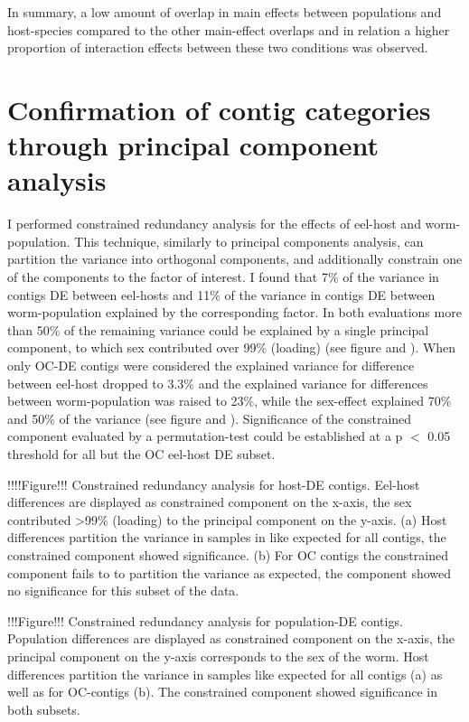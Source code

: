 \documentclass[10pt]{article}
\begin{document}
In summary, a low amount of overlap in main effects between
populations and host-species compared to the other main-effect
overlaps and in relation a higher proportion of interaction effects
between these two conditions was observed.

\section{Confirmation of contig categories through principal component
  analysis}

I performed constrained redundancy analysis for the effects of
eel-host and worm-population. This technique, similarly to principal
components analysis, can partition the variance into orthogonal
components, and additionally constrain one of the components to the
factor of interest. I found that 7\% of the variance in contigs DE
between eel-hosts and 11\% of the variance in contigs DE between
worm-population explained by the corresponding factor. In both
evaluations more than 50\% of the remaining variance could be
explained by a single principal component, to which sex contributed
over 99\% (loading) (see figure and ). When only OC-DE contigs were
considered the explained variance for difference between eel-host
dropped to 3.3\% and the explained variance for differences between
worm-population was raised to 23\%, while the sex-effect explained
70\% and 50\% of the variance (see figure and ). Significance of the
constrained component evaluated by a permutation-test could be
established at a p $<$ 0.05 threshold for all but the OC eel-host DE
subset.

!!!!Figure!!! Constrained redundancy analysis for host-DE
contigs. Eel-host differences are displayed as constrained component
on the x-axis, the sex contributed >99\% (loading) to the principal
component on the y-axis. (a) Host differences partition the variance
in samples in like expected for all contigs, the constrained component
showed significance. (b) For OC contigs the constrained component
fails to to partition the variance as expected, the component showed
no significance for this subset of the data.

!!!Figure!!! Constrained redundancy analysis for population-DE
contigs. Population differences are displayed as constrained component
on the x-axis, the principal component on the y-axis corresponds to
the sex of the worm. Host differences partition the variance in
samples like expected for all contigs (a) as well as for OC-contigs
(b). The constrained component showed significance in both subsets.
\end{document}

